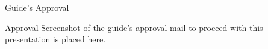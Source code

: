 \documentclass[aspectratio=169,11pt]{beamer}
\begin{document}
\begin{frame}{Guide's Approval}
  \vfill
  \begin{center}
    \begin{minipage}{0.78\textwidth}
      \begin{block}{Approval}
        \small
        Screenshot of the guide's approval mail to proceed with this
        presentation is placed here.
      \end{block}
      \vspace{2mm}
      \begin{center}
        \setlength{\fboxsep}{6mm}
      \end{center}
    \end{minipage}
  \end{center}
  \vfill
\end{frame}
\end{document}
